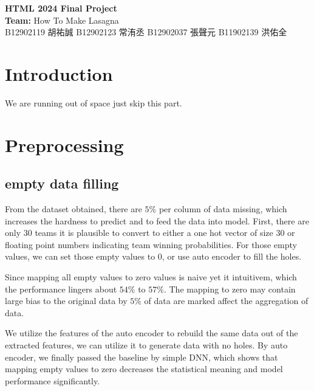 \documentclass[11pt,a4paper]{article}
\begin{document}
\begin{center}
  {\LARGE \bf HTML 2024 Final Project}\\[8pt]
  \textbf{Team:} How To Make Lasagna\\
  B12902119 胡祐誠
  B12902123 常洧丞
  B12902037 張聲元
  B11902139 洪佑全
\end{center}


\section{Introduction}
We are running out of space just skip this part.

\section{Preprocessing}
\subsection{empty data filling}
From the dataset obtained, there are $5\%$ per column of data missing, which increases the hardness to predict and to feed the data into model.
First, there are only $30$ teams it is plausible to convert to either a one hot vector of size $30$ or floating point numbers indicating team winning probabilities.
For those empty values, we can set those empty values to $0$, or use auto encoder to fill the holes.

Since mapping all empty values to zero values is naive yet it intuitivem, which the performance lingers about $54\%$ to $57\%$.
The mapping to zero may contain large bias to the original data by $5\%$ of data are marked affect the aggregation of data.

We utilize the features of the auto encoder to rebuild the same data out of the extracted features, we can utilize it to generate data with no holes.
By auto encoder, we finally passed the baseline by simple DNN, which shows that mapping empty values to zero decreases the statistical meaning and model performance significantly.
\end{document}
